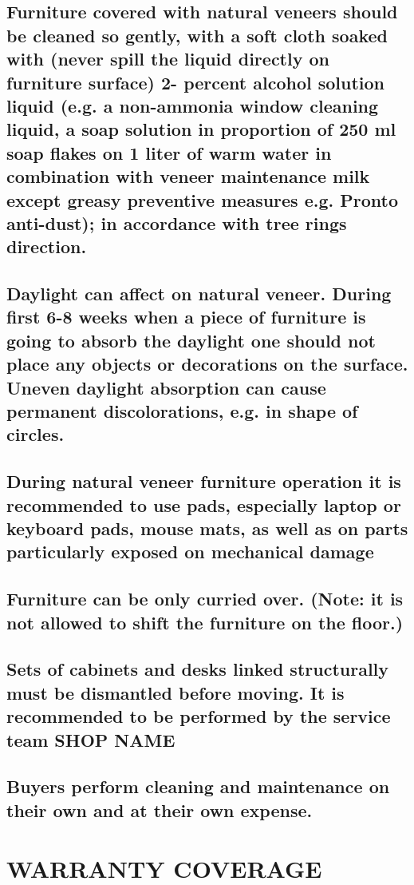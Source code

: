 \documentclass[10pt,a4paper]{article}
\newcommand{\shopname}{SHOP NAME}
\begin{document}
\subsection{Furniture covered with natural veneers should be cleaned so gently, with a soft cloth soaked with (never spill the liquid directly on furniture surface) 2- percent alcohol solution liquid (e.g. a non-ammonia window cleaning liquid, a soap solution in proportion of 250 ml soap flakes on 1 liter of warm water in combination with veneer maintenance milk except greasy preventive measures e.g. Pronto anti-dust); in accordance with tree rings direction.}

\subsection{Daylight can affect on natural veneer. During first 6-8 weeks when a piece of furniture is going to absorb the daylight one should not place any objects or decorations on the surface. Uneven daylight absorption can cause permanent discolorations, e.g. in shape of circles.}

\subsection{During natural veneer furniture operation it is recommended to use pads, especially laptop or keyboard pads, mouse mats, as well as on parts particularly exposed on mechanical damage}

\subsection{Furniture can be only curried over. (Note: it is not allowed to shift the furniture on the floor.)}

\subsection{Sets of cabinets and desks linked structurally must be dismantled before moving. It is recommended to be performed by the service team \shopname}

\subsection{Buyers perform cleaning and maintenance on their own and at their own expense.}

\section{WARRANTY COVERAGE}
\end{document}
